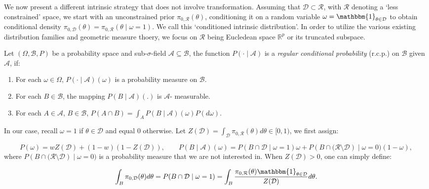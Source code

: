 \documentclass[10pt]{article}
\newcommand{\mc}[1]{\mathcal{#1}}
\DeclareMathOperator{\1}{\mathbbm{1}}
\begin{document}
We now present a different intrinsic strategy that does not involve transformation. Assuming that $\mc D \subset \mc R$, with $\mc R$ denoting a `less constrained' space, we start with an unconstrained prior $\pi_{0,\mc R}(\theta)$, conditioning it on a random variable $\omega=\mathbbm{1}_{\theta\in \mc D}$ to obtain conditional density $\pi_{0,\mc D}(\theta)= \pi_{0,\mc R}(\theta \mid \omega=1)$. We call this `conditioned intrinsic distribution'. In order to utilize the various existing distribution families and geometric measure thoery, we focus on $\mc R$ being Eucledean space $\mathbb{R}^{p}$ or its truncated subspace.

Let $(\Omega, \mathscr B, P)$ be a probability space and sub-$\sigma$-field $\mathscr A\subseteq \mathscr B$, the function $P(\cdot\mid \mathscr A)$ is a {\it regular conditional probability} (r.c.p.) \citep{kolmogorov1950foundations} on $\mathscr B$ given $\mathscr A$, if:
\begin{enumerate}
	\item For each $\omega\in  \Omega$, $P(\cdot\mid \mathscr A)(\omega)$ is a probability measure on $\mathscr B$.
	\item For each $B\in \mathscr B$, the mapping $P(B\mid \mathscr A)(.)$ is $\mathscr A$- measurable.
	\item For each $A \in \mathscr A$, $B\in \mathscr B$, $P(A\cap B)=\int_{A} P(B\mid \mathscr A)(\omega)P(d\omega)$.
\end{enumerate}

In our case, recall $\omega=1$ if $\theta\in \mc D$ and equal $0$ otherwise. Let $Z(\mc D)=\int_{\mc D} \pi_{0,\mc R}(\theta)d\theta \in [0,1)$, we first assign:

\begin{equation}
\label{rcp}
	P(\omega) = w Z(\mc D)  + (1-w)(1-Z(\mc D)), \qquad  P(B \mid  \mathscr A)(\omega)={P({B\cap  \mc D} \mid \omega=1)} \omega +  {P({B\cap (\mc R \setminus \mc D})\mid \omega=0)}(1-\omega),
\end{equation}
where $P({B\cap (\mc R \setminus \mc D})\mid \omega=0)$ is a probability measure that we are not interested in. When $Z(\mc D)>0$, one can simply define:

\begin{equation}
\begin{aligned}
\label{exact_prior1}
 \int_{B} \pi_{0,\mc D}(\theta) d\theta= {P({B\cap  \mc D} \mid \omega=1)}=\int_{B} \frac{  \pi_{0,\mc R}(\theta) \mathbbm{1}_{\theta\in \mc D}}{ Z(\mc D) } d\theta  .
\end{aligned}
\end{equation}
\end{document}
